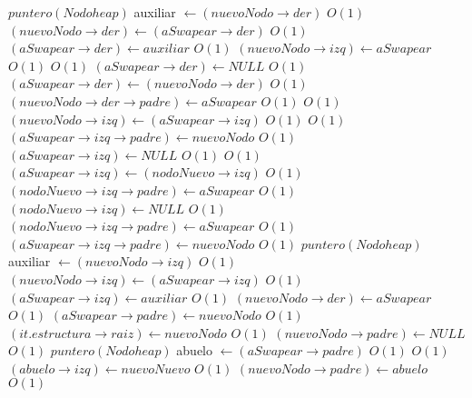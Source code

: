 \begin{Algoritmos}
\begin{algorithmic}[1]
									\State $puntero(Nodoheap)$ auxiliar $\gets (nuevoNodo \rightarrow der)$ \Comment $O(1)$
									\State $(nuevoNodo \rightarrow der) \gets (aSwapear \rightarrow der)$ \Comment $O(1)$
									\State $(aSwapear \rightarrow der) \gets auxiliar$ \Comment $O(1)$
								\EndIf
							\EndIf
						\State $(nuevoNodo \rightarrow izq) \gets aSwapear$ \Comment $O(1)$
					\Else
						 \Comment $O(1)$
								\State $(aSwapear \rightarrow der) \gets NULL$ \Comment $O(1)$
							\Else
								\State $(aSwapear \rightarrow der) \gets (nuevoNodo \rightarrow der)$ \Comment $O(1)$
								\State $(nuevoNodo \rightarrow der \rightarrow padre) \gets aSwapear$ \Comment $O(1)$
							\EndIf
							 \Comment $O(1)$
								\State $(nuevoNodo \rightarrow izq) \gets (aSwapear \rightarrow izq)$ \Comment $O(1)$
								 \Comment $O(1)$
									\State $(aSwapear \rightarrow izq \rightarrow padre) \gets nuevoNodo$	\Comment $O(1)$						
								\EndIf
								\State $(aSwapear \rightarrow izq) \gets NULL$ \Comment $O(1)$
							\Else
								 \Comment $O(1)$
									\State $(aSwapear \rightarrow izq) \gets (nodoNuevo \rightarrow izq)$ \Comment $O(1)$
									\State $(nodoNuevo \rightarrow izq \rightarrow padre) \gets aSwapear$ \Comment $O(1)$
									\State $(nodoNuevo \rightarrow izq) \gets NULL$ \Comment $O(1)$
								\Else
									\State $(nodoNuevo \rightarrow izq \rightarrow padre) \gets aSwapear$ \Comment $O(1)$
									\State $(aSwapear \rightarrow izq \rightarrow padre) \gets nuevoNodo$ \Comment $O(1)$
									\State $puntero(Nodoheap)$ auxiliar $\gets (nuevoNodo \rightarrow izq)$ \Comment $O(1)$
									\State $(nuevoNodo \rightarrow izq) \gets (aSwapear \rightarrow izq)$ \Comment $O(1)$
									\State $(aSwapear \rightarrow izq) \gets auxiliar$ \Comment $O(1)$
								\EndIf
							\EndIf
						\State $(nuevoNodo \rightarrow der) \gets aSwapear$ \Comment $O(1)$
					\EndIf	
					\State $(aSwapear \rightarrow padre) \gets nuevoNodo$ \Comment $O(1)$
					\State $(it.estructura \rightarrow raiz) \gets nuevoNodo$	 \Comment $O(1)$
					\State $(nuevoNodo \rightarrow padre) \gets NULL$			 \Comment $O(1)$
					\Else
					\State $puntero(Nodoheap)$ abuelo $\gets (aSwapear \rightarrow padre)$ \Comment $O(1)$
						 \Comment $O(1)$
							\State $(abuelo \rightarrow izq) \gets nuevoNuevo$ \Comment $O(1)$
							\State $(nuevoNodo \rightarrow padre) \gets abuelo$ \Comment $O(1)$

\end{algorithmic}
\end{Algoritmos}
